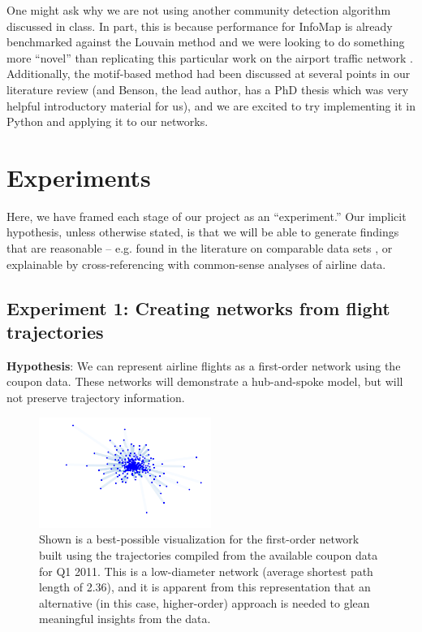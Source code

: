 \documentclass[sigconf]{acmart}
\begin{document}
One might ask why we are not using another community detection algorithm discussed in class. In part, this is because performance for InfoMap is already benchmarked against the Louvain method and we were looking to do something more ``novel'' than replicating this particular work on the airport traffic network \cite{Rosvall2014}. Additionally, the motif-based method had been discussed at several points in our literature review (and Benson, the lead author, has a PhD thesis which was very helpful introductory material for us), and we are excited to try implementing it in Python and applying it to our networks.

\section{Experiments}
Here, we have framed each stage of our project as an ``experiment.'' Our implicit hypothesis, unless otherwise stated, is that we will be able to generate findings that are reasonable -- e.g. found in the literature on comparable data sets \cite{Rosvall2014}, or explainable by cross-referencing with common-sense analyses of airline data.

\subsection{Experiment 1: Creating networks from flight trajectories}
\textbf{Hypothesis}: We can represent airline flights as a first-order network using the coupon data. These networks will demonstrate a hub-and-spoke model, but will not preserve trajectory information.

\begin{figure}
    \centering
    \includegraphics[width=0.5\textwidth]{first_order_network.png}
    \caption{Shown is a best-possible visualization for the first-order network built using the trajectories compiled from the available coupon data for Q1 2011. This is a low-diameter network (average shortest path length of 2.36), and it is apparent from this representation that an alternative (in this case, higher-order) approach is needed to glean meaningful insights from the data.}
    \label{fig:first_order}
\end{figure}
\end{document}
